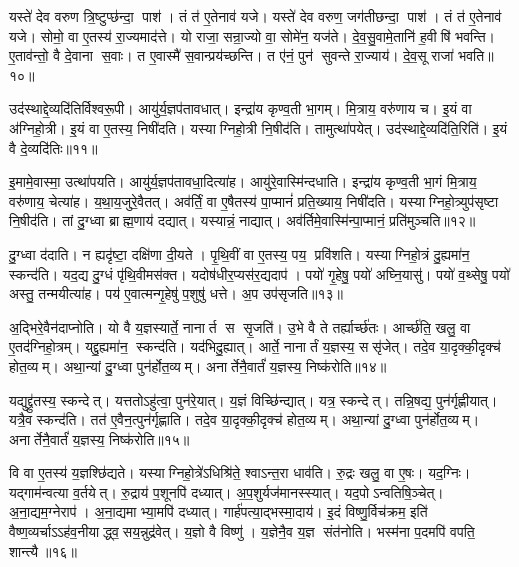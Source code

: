 यस्ते॑ देव वरुण त्रि॒ष्टुप्छ॑न्दा॒ पाश॑। तं त॑ ए॒तेनाव॑ यजे। यस्ते॑ देव वरुण॒ जग॑तीछन्दा॒ पाश॑। तं त॑ ए॒तेनाव॑ यजे। सोमो॒ वा ए॒तस्य॑ रा॒ज्यमाद॑त्ते। यो राजा॒ सन्रा॒ज्यो वा॒ सोमे॑न॒ यज॑ते। दे॒व॒सु॒वामे॒तानि॑ ह॒वीषि॑ भवन्ति। ए॒ताव॑न्तो॒ वै दे॒वाना स॒वाः। त ए॒वास्मै॑ स॒वान्प्रय॑च्छन्ति। त ए॑नं॒ पुन॑ सुवन्ते रा॒ज्याय॑। दे॒व॒सू राजा॑ भवति॥१०॥\anuvakamend[सोम॑ आवि॒शन् य॑जे रा॒ज्यायैकं॑ च]

उद॑स्थाद्दे॒व्यदि॑तिर्विश्वरू॒पी। आयु॑र्य॒ज्ञप॑तावधात्। इन्द्रा॑य कृण्व॒ती भा॒गम्। मि॒त्राय॒ वरु॑णाय च। इ॒यं वा अ॑ग्निहो॒त्री। इ॒यं वा ए॒तस्य॒ निषी॑दति। यस्याग्निहो॒त्री नि॒षीद॑ति। तामुत्था॑पयेत्। उद॑स्थाद्दे॒व्यदि॑ति॒रिति॑। इ॒यं वै दे॒व्यदि॑तिः॥११॥

इ॒मामे॒वास्मा॒ उत्था॑पयति। आयु॑र्य॒ज्ञप॑तावधा॒दित्या॑ह। आयु॑रे॒वास्मि॑न्दधाति। इन्द्रा॑य कृण्व॒ती भा॒गं मि॒त्राय॒ वरु॑णाय॒ चेत्या॑ह। य॒था॒य॒जुरे॒वैतत्। अव॑र्तिं॒ वा ए॒षैतस्य॑ पा॒प्मानं॑ प्रति॒ख्याय॒ निषी॑दति। यस्याग्निहो॒त्र्युप॑सृष्टा नि॒षीद॑ति। तां दु॒ग्ध्वा ब्राह्म॒णाय॑ दद्यात्। यस्यान्नं॒ नाद्यात्। अव॑र्तिमे॒वास्मि॑न्पा॒प्मानं॒ प्रति॑मुञ्चति॥१२॥

दु॒ग्ध्वा द॑दाति। न ह्यदृ॑ष्टा॒ दक्षि॑णा दी॒यते। पृ॒थि॒वीं वा ए॒तस्य॒ पय॒ प्रवि॑शति। यस्याग्निहो॒त्रं दु॒ह्यमा॑न॒ स्कन्द॑ति। यद॒द्य दु॒ग्धं पृ॑थि॒वीमस॑क्त। यदोष॑धीर॒प्यस॑र॒द्यदाप॑। पयो॑ गृ॒हेषु॒ पयो॑ अघ्नि॒यासु॑। पयो॑ व॒थ्सेषु॒ पयो॑ अस्तु॒ तन्मयीत्या॑ह। पय॑ ए॒वात्मन्गृ॒हेषु॑ प॒शुषु॑ धत्ते। अ॒प उप॑सृजति॥१३॥

अ॒द्भिरे॒वैन॑दाप्नोति। यो वै य॒ज्ञस्यार्ते॒ नानार्त स सृ॒जति॑। उ॒भे वै ते तर्ह्यार्च्छ॑तः। आर्च्छ॑ति॒ खलु॒ वा ए॒तद॑ग्निहो॒त्रम्। यद्दु॒ह्यमा॑न॒ स्कन्द॑ति। यद॑भिदु॒ह्यात्। आर्ते॒ नानार्तं य॒ज्ञस्य॒ ससृ॑जेत्। तदे॒व या॒दृक्की॒दृक्च॑ होत॒व्यम्। अथा॒न्यां दु॒ग्ध्वा पुन॑र्\mbox{}होत॒व्यम्। अनार्तेनै॒वार्तं॑ य॒ज्ञस्य॒ निष्क॑रोति॥१४॥

यद्युद्द्रु॑तस्य॒ स्कन्देत्। यत्ततोऽहु॑त्वा॒ पुन॑रे॒यात्। य॒ज्ञं विच्छि॑न्द्यात्। यत्र॒ स्कन्देत्। तन्नि॒षद्य॒ पुन॑र्गृह्णीयात्। यत्रै॒व स्कन्द॑ति। तत॑ ए॒वैन॒त्पुन॑र्गृह्णाति। तदे॒व या॒दृक्की॒दृक्च॑ होत॒व्यम्। अथा॒न्यां दु॒ग्ध्वा पुन॑र्\mbox{}होत॒व्यम्। अनार्तेनै॒वार्तं॑ य॒ज्ञस्य॒ निष्क॑रोति॥१५॥

वि वा ए॒तस्य॑ य॒ज्ञश्छि॑द्यते। यस्याग्निहो॒त्रे॑ऽधिश्रि॑ते॒ श्वाऽन्त॒रा धाव॑ति। रु॒द्रः खलु॒ वा ए॒षः। यद॒ग्निः। यद्गाम॑न्वत्या व॒र्तयेत्। रु॒द्राय॑ प॒शूनपि॑ दध्यात्। अ॒प॒शुर्यज॑मानस्स्यात्। यद॒पोऽन्वतिषि॒ञ्चेत्। अ॒ना॒द्यम॒ग्नेराप॑। अ॒ना॒द्यमाभ्या॒मपि॑ दध्यात्। गार्\mbox{}ह॑पत्या॒द्भस्मा॒दाय॑। इ॒दं विष्णु॒र्विच॑क्रम॒ इति॑ वैष्ण॒व्यर्चाऽऽह॑व॒नीयाद्ध्व॒सय॒न्नुद्र॑वेत्। य॒ज्ञो वै विष्णु॑। य॒ज्ञेनै॒व य॒ज्ञ संत॑नोति। भस्म॑ना प॒दमपि॑ वपति॒ शान्त्यै॥१६॥\anuvakamend[वै दे॒व्यदि॑तिर्मुञ्चति सृजति करोति करोत्याभ्या॒मपि॑ दध्या॒त् पञ्च॑ च]


